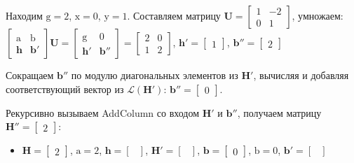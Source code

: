 \begin{enumerate}
Находим $ \mathrm{g} = 2 $, $ \mathrm{x} = 0 $, $ \mathrm{y} = 1 $. Составляем матрицу $  \mathbf{U} = \left[\begin{array}{cccc}
1 & -2 \\
0 & 1
\end{array}\right] $, умножаем: $ \left[ \begin{array}{cccc}
\mathrm{a} & \mathrm{b} \\
\mathbf{h} & \mathbf{b}' \end{array} \right] \mathbf{U}=
\left[ \begin{array}{cccc}
\mathrm{g} & \mathrm{0} \\
\mathbf{h}' & \mathbf{b}'' \end{array} \right] = \left[\begin{array}{cccc}
2 & 0 \\
1 & 2
\end{array}\right] $, $ \mathbf{h}' = \left[\begin{array}{cccc}
1
\end{array}\right] $, $ \mathbf{b}'' = \left[\begin{array}{cccc}
2
\end{array}\right] $

Сокращаем $ \mathbf{b}'' $ по модулю диагональных элементов из $ \mathbf{H}' $, вычисляя и добавляя соответствующий вектор из $ \mathcal{L}(\mathbf{H}') $: $ \mathbf{b}'' = \left[ \begin{array}{cccc}
0
\end{array}\right] $.

Рекурсивно вызываем AddColumn со входом $ \mathbf{H}' $ и $ \mathbf{b}'' $, получаем матрицу $ \mathbf{H}'' = \left[\begin{array}{cccc}
2
\end{array}\right] $:
\begin{itemize}
\item $ \mathbf{H} = \left[\begin{array}{cccc}
2
\end{array}\right] $, $ \mathrm{a} = 2 $, $ \mathbf{h} = \left[\begin{array}{cccc}
\end{array}\right] $, $ \mathbf{H}' = \left[ \begin{array}{cccc}
\end{array}\right] $, $ \mathbf{b} = \left[\begin{array}{cccc}
0
\end{array}\right] $, $ \mathrm{b} = 0 $, $ \mathbf{b}' = \left[ \begin{array}{cccc}
\end{array}\right] $


\end{itemize}
\end{enumerate}
